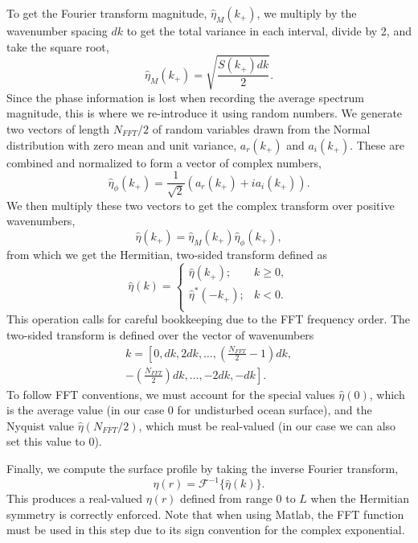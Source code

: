 To get the Fourier transform magnitude, $\hat{\eta}_M(k_+)$, we multiply by the wavenumber spacing $dk$ to get the total variance in each interval, divide by 2, and take the square root,
\begin{equation}
\hat{\eta}_M(k_+) = \sqrt{\frac{S(k_+)dk}{2}}.
\end{equation}
Since the phase information is lost when recording the average spectrum magnitude, this is where we re-introduce it using random numbers. We generate two vectors of length $N_{FFT}/2$ of random variables drawn from the Normal distribution with zero mean and unit variance, $a_r(k_+)$ and $a_i(k_+)$. These are combined and normalized to form a vector of complex numbers,
\begin{equation}
\hat{\eta}_\phi(k_+) = \frac{1}{\sqrt{2}}\left(a_r(k_+)+ia_i(k_+)\right).
\end{equation} 
We then multiply these two vectors to get the complex transform over positive wavenumbers,
\begin{equation}
\hat{\eta}(k_+) = \hat{\eta}_M(k_+) \hat{\eta}_\phi(k_+),
\end{equation}
from which we get the Hermitian, two-sided transform defined as
\begin{equation}
\hat{\eta}(k) = 
\begin{cases}
\hat{\eta}(k_+); & k\ge 0, \\
\hat{\eta}^*(-k_+); & k< 0. \\
\end{cases}\label{eq:Hermitian}
\end{equation}
This operation calls for careful bookkeeping due to the FFT frequency order. The two-sided transform is defined over the vector of wavenumbers
\begin{multline}
k = \left[0, dk, 2dk, \ldots, \left(\frac{N_{FFT}}{2}-1\right)dk,\right. \\
\left.-\left(\frac{N_{FFT}}{2}\right)dk, \ldots, -2dk, -dk\right].
\end{multline}
To follow FFT conventions, we must account for the special values $\hat{\eta}(0)$, which is the average value (in our case 0 for undisturbed ocean surface), and the Nyquist value $\hat{\eta}(N_{FFT}/2)$, which must be real-valued (in our case we can also set this value to 0).

Finally, we compute the surface profile by taking the inverse Fourier transform,
\begin{equation}
\eta(r) = \mathcal{F}^{-1}\{\hat{\eta}(k)\}.
\end{equation}
This produces a real-valued $\eta(r)$ defined from range $0$ to $L$ when the Hermitian symmetry is correctly enforced. Note that when using Matlab, the FFT function must be used in this step due to its sign convention for the complex exponential.

